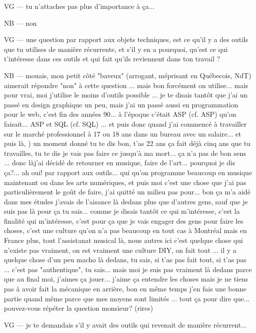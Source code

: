 VG — tu n'attaches pas plus d'importance à ça...

NB — non

VG — une question par rapport aux objets techniques, est ce qu'il y a des outils que tu utilises de manière récurrente, et s'il y en a pourquoi, qu'est ce qui t'intéresse dans ces outils et qui fait qu'ils reviennent dans ton travail ?

NB — mouais, mon petit côté "baveux" (arrogant, méprisant en Québecois, NdT) aimerait répondre "non" à cette question ... mais bon forcément on utilise... mais pour vrai, moi j'utilise le moins d'outils possible ... je te disais tantôt que j'ai un passé en design graphique un peu, mais j'ai un passé aussi en programmation pour le web, c'est fin des années 90... à l'époque c'était ASP (cf. \gls{ASP}) qu'on faisait... ASP et SQL (cf. \gls{SQL}) ... et puis donc quand j'ai commencé à travailler sur le marché professionnel à 17 ou 18 ans dans un bureau avec un salaire... et puis là, ) un moment donné tu te dis bon, t'as 22 ans ça fait déjà cinq ans que tu travailles, tu te dis je vais pas faire ce jusqu'à ma mort... ça n'a pas de bon sens ... donc làj'ai décidé de retourner en musique, faire de l'art... pourquoi je dis ça?... ah oui! par rapport aux outils... qui qu'on programme beaucoup en musique maintenant ou dans les arts numériques, et puis moi c'est une chose que j'ai pas particulièrement le goût de faire, j'ai quitté un milieu pas pour... bon ça m'a aidé dans mes études j'avais de l'aisance là dedans plus que d'autres gens, sauf que je suis pas là pour ça tu sais... comme je disais tantôt ce qui m'intéresse, c'est la finalité qui m'intéresse, c'est pour ça que je vais engager des gens pour faire les choses, c'est une culture qu'on n'a pas beaucoup en tout cas à Montréal mais en France plus, tout l'assistanat musical là, nous autres ici c'est quelque chose qui n'existe pas vraiment, on est vraiment une culture \gls{DIY}, on fait tout ... il y a quelque chose d'un peu macho là dedans, tu sais, si t'as pas fait tout, si t'as pas ...  c'est pas "authentique", tu sais... mais moi je suis pas vraiment là dedans parce que au final moi, j'aimes ça jouer... j'aime ça entendre les choses mais je ne tiens pas à avoir fait la mécanique en arrière, bon en même temps j'en fais une bonne partie quand même parce que mes moyens sont limités ... tout ça pour dire que... pouvez-vous répéter la question monsieur? (rires)

VG — je te demandais s'il y avait des outils qui revenait de manière récurrent...

